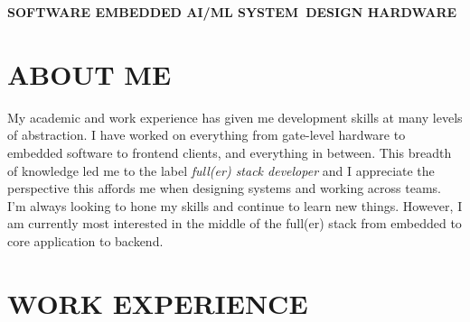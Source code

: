 \documentclass[a4paper,nocolors]{cv-friggeri-ben}
\begin{document}

\vspace{-1em}\hspace{-4.33cm}
\textbf{\large{%
\hfill SOFTWARE \hfill {\small\textbullet}%
\hfill EMBEDDED \hfill {\small\textbullet}%
\hfill AI/ML \hfill {\small\textbullet}%
\hfill SYSTEM~DESIGN \hfill {\small\textbullet}%
\hfill HARDWARE \hfill%
}}%

\vspace{-1ex}\hspace{-4.33cm}\hrulefill


\vspace{-2pt}
\section{ABOUT ME}

My academic and work experience has given me development skills at many levels
of abstraction. I have worked on everything from gate-level hardware to
embedded software to frontend clients, and everything in between. This breadth
of knowledge led me to the label \emph{full(er) stack developer} and I
appreciate the perspective this affords me when designing systems and working
across teams. I'm always looking to hone my skills and continue to learn new
things. However, I am currently most interested in the middle of the full(er)
stack from embedded to core application to backend.




\section{WORK EXPERIENCE}
\end{document}
